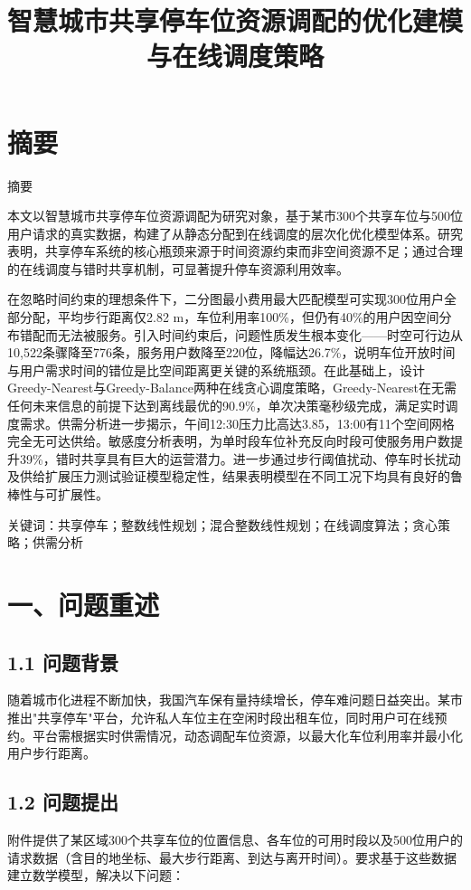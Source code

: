 \documentclass{ctexart}
\title{\fontsize{16pt}{20pt}\selectfont\heiti 智慧城市共享停车位资源调配的优化建模与在线调度策略}
\date{}
\author{}
\makeatletter
\renewenvironment{abstract}{%
  \if@twocolumn
    \section*{\abstractname}%
  \else
    \begin{center}%
      {\fontsize{12pt}{20pt}\selectfont\songti\abstractname}%
      \vspace{0.5em}%
    \end{center}%
  \fi
}{\par}
\renewcommand{\abstractname}{摘要}
\makeatother
\begin{document}
\fontsize{12pt}{20pt}\selectfont\songti
\setcounter{page}{1}
\maketitle
\begin{abstract}
  本文以智慧城市共享停车位资源调配为研究对象，基于某市300个共享车位与500位用户请求的真实数据，构建了从静态分配到在线调度的层次化优化模型体系。研究表明，共享停车系统的核心瓶颈来源于时间资源约束而非空间资源不足；通过合理的在线调度与错时共享机制，可显著提升停车资源利用效率。

  在忽略时间约束的理想条件下，二分图最小费用最大匹配模型可实现300位用户全部分配，平均步行距离仅2.82 m，车位利用率100\%，但仍有40\%的用户因空间分布错配而无法被服务。引入时间约束后，问题性质发生根本变化——时空可行边从10,522条骤降至776条，服务用户数降至220位，降幅达26.7\%，说明车位开放时间与用户需求时间的错位是比空间距离更关键的系统瓶颈。在此基础上，设计Greedy-Nearest与Greedy-Balance两种在线贪心调度策略，Greedy-Nearest在无需任何未来信息的前提下达到离线最优的90.9\%，单次决策毫秒级完成，满足实时调度需求。供需分析进一步揭示，午间12:30压力比高达3.85，13:00有11个空间网格完全无可达供给。敏感度分析表明，为单时段车位补充反向时段可使服务用户数提升39\%，错时共享具有巨大的运营潜力。进一步通过步行阈值扰动、停车时长扰动及供给扩展压力测试验证模型稳定性，结果表明模型在不同工况下均具有良好的鲁棒性与可扩展性。\par
  关键词：共享停车；整数线性规划；混合整数线性规划；在线调度算法；贪心策略；供需分析
\end{abstract}

\newpage
\section*{一、问题重述}

\subsection*{1.1 问题背景}

随着城市化进程不断加快，我国汽车保有量持续增长，停车难问题日益突出。某市推出"共享停车"平台，允许私人车位主在空闲时段出租车位，同时用户可在线预约。平台需根据实时供需情况，动态调配车位资源，以最大化车位利用率并最小化用户步行距离。

\subsection*{1.2 问题提出}

附件提供了某区域300个共享车位的位置信息、各车位的可用时段以及500位用户的请求数据（含目的地坐标、最大步行距离、到达与离开时间）。要求基于这些数据建立数学模型，解决以下问题：
\end{document}
